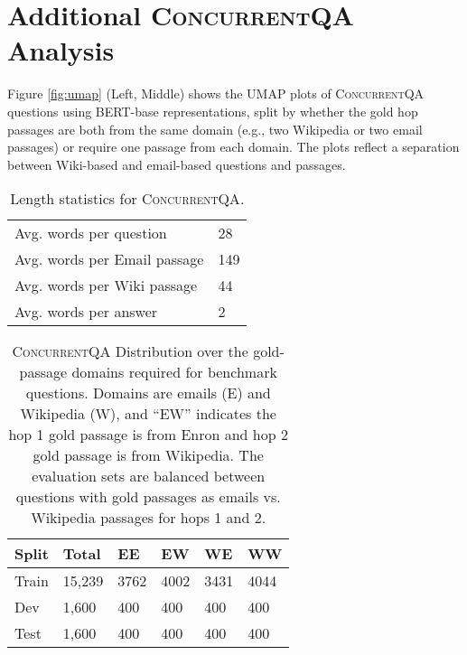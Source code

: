 \documentclass{article}
\newcommand{\datasetname}{\textsc{ConcurrentQA}\xspace}
\begin{document}
 
\section{Additional \datasetname Analysis}

Figure \ref{fig:umap} (Left, Middle) shows the UMAP plots of \datasetname questions using BERT-base representations, split by whether the gold hop passages are both from the same domain (e.g., two Wikipedia or two email passages) or require one passage from each domain. The plots reflect a separation between Wiki-based and email-based questions and passages.


\begin{table}[t]
\begin{center}
\begin{tabular}{p{5cm}p{1.5cm}}
\toprule
Avg. words per question & 28 \\
Avg. words per Email passage & 149 \\
Avg. words per Wiki passage   & 44 \\
Avg. words per answer & 2 \\
\bottomrule
\end{tabular}
\caption{Length statistics for \datasetname.}
\vspace{3mm}
\label{tab:mutlihopqa_stats}
\end{center}
\end{table}


\begin{table}[t]
\begin{center}
\begin{tabular}{p{1cm}p{1cm}p{0.75cm}p{0.75cm}p{0.75cm}p{0.75cm}}
\toprule
Split & Total & EE & EW & WE & WW \\
\midrule
Train & 15,239  &  3762 & 4002 & 3431 & 4044 \\
Dev   & 1,600 & 400 & 400 & 400 & 400 \\
Test  & 1,600 & 400 & 400 & 400 & 400 \\
\bottomrule
\end{tabular}
\caption{\datasetname Distribution over the gold-passage domains required for benchmark questions. Domains are emails (E) and Wikipedia (W), and ``EW'' indicates the hop 1 gold passage is from Enron and hop 2 gold passage is from Wikipedia. The evaluation sets are balanced between questions with gold passages as emails vs. Wikipedia passages for hops 1 and 2.}
\vspace{3mm}
\label{tab:mutlihopqa_domaintypes}
\end{center}
\end{table}
\end{document}

